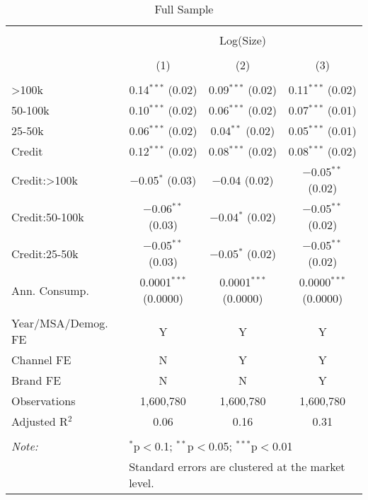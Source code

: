 
\begin{table}[!htbp] \centering 
  \caption{Full Sample} 
  \label{tab:packageSizeFullSoda} 
\begin{tabular}{@{\extracolsep{5pt}}lccc} 
\\[-1.8ex]\hline 
\hline \\[-1.8ex] 
 & \multicolumn{3}{c}{Log(Size)} \\ 
\\[-1.8ex] & (1) & (2) & (3)\\ 
\hline \\[-1.8ex] 
 >100k & 0.14$^{***}$ (0.02) & 0.09$^{***}$ (0.02) & 0.11$^{***}$ (0.02) \\ 
  50-100k & 0.10$^{***}$ (0.02) & 0.06$^{***}$ (0.02) & 0.07$^{***}$ (0.01) \\ 
  25-50k & 0.06$^{***}$ (0.02) & 0.04$^{**}$ (0.02) & 0.05$^{***}$ (0.01) \\ 
  Credit & 0.12$^{***}$ (0.02) & 0.08$^{***}$ (0.02) & 0.08$^{***}$ (0.02) \\ 
  Credit:>100k & $-$0.05$^{*}$ (0.03) & $-$0.04 (0.02) & $-$0.05$^{**}$ (0.02) \\ 
  Credit:50-100k & $-$0.06$^{**}$ (0.03) & $-$0.04$^{*}$ (0.02) & $-$0.05$^{**}$ (0.02) \\ 
  Credit:25-50k & $-$0.05$^{**}$ (0.03) & $-$0.05$^{*}$ (0.02) & $-$0.05$^{**}$ (0.02) \\ 
  Ann. Consump. & 0.0001$^{***}$ (0.0000) & 0.0001$^{***}$ (0.0000) & 0.0000$^{***}$ (0.0000) \\ 
 \hline \\[-1.8ex] 
Year/MSA/Demog. FE & Y & Y & Y \\ 
Channel FE & N & Y & Y \\ 
Brand FE & N & N & Y \\ 
Observations & 1,600,780 & 1,600,780 & 1,600,780 \\ 
Adjusted R$^{2}$ & 0.06 & 0.16 & 0.31 \\ 
\hline 
\hline \\[-1.8ex] 
\textit{Note:}  & \multicolumn{3}{l}{$^{*}$p$<$0.1; $^{**}$p$<$0.05; $^{***}$p$<$0.01} \\ 
 & \multicolumn{3}{l}{Standard errors are clustered at the market level.} \\ 
\end{tabular} 
\end{table} 
